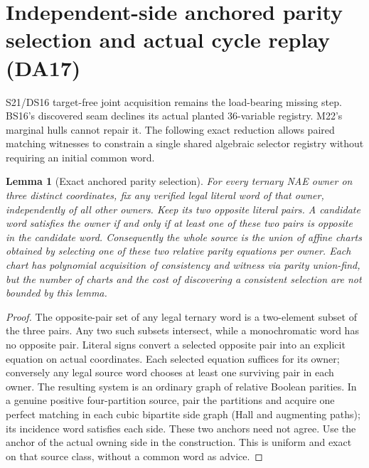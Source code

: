 \documentclass[11pt]{article}
\newtheorem{lemma}[theorem]{Lemma}
\begin{document}
\section{Independent-side anchored parity selection and actual cycle replay (DA17)}\label{sec:da17}
S21/DS16 target-free joint acquisition remains the load-bearing missing step. BS16's discovered seam declines its actual planted 36-variable registry. M22's marginal hulls cannot repair it. The following exact reduction allows paired matching witnesses to constrain a single shared algebraic selector registry without requiring an initial common word.
\begin{lemma}[Exact anchored parity selection]\label{lem:da17-select}
For every ternary NAE owner on three distinct coordinates, fix any verified legal literal word of that owner, independently of all other owners. Keep its two opposite literal pairs. A candidate word satisfies the owner if and only if at least one of these two pairs is opposite in the candidate word. Consequently the whole source is the union of affine charts obtained by selecting one of these two relative parity equations per owner. Each chart has polynomial acquisition of consistency and witness via parity union-find, but the number of charts and the cost of discovering a consistent selection are not bounded by this lemma.
\end{lemma}
\begin{proof}
The opposite-pair set of any legal ternary word is a two-element subset of the three pairs. Any two such subsets intersect, while a monochromatic word has no opposite pair. Literal signs convert a selected opposite pair into an explicit equation on actual coordinates. Each selected equation suffices for its owner; conversely any legal source word chooses at least one surviving pair in each owner. The resulting system is an ordinary graph of relative Boolean parities. In a genuine positive four-partition source, pair the partitions and acquire one perfect matching in each cubic bipartite side graph (Hall and augmenting paths); its incidence word satisfies each side. These two anchors need not agree. Use the anchor of the actual owning side in the construction. This is uniform and exact on that source class, without a common word as advice.
\end{proof}
\end{document}
